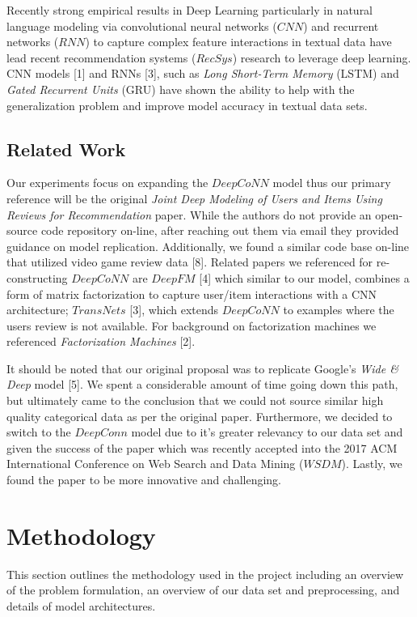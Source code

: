 \documentclass[10pt, twocolumn, letterpaper]{article}
\begin{document}
\par Recently strong empirical results in Deep Learning particularly in natural language modeling via convolutional neural networks ($CNN$) and recurrent networks ($RNN$) to capture complex feature interactions in textual data have lead recent recommendation systems ($RecSys$) research to leverage  deep learning. CNN models [1] and RNNs [3], such as \textit{Long Short-Term Memory} (LSTM) and \textit{Gated Recurrent Units} (GRU) have shown the ability to help with the generalization problem and improve model accuracy in textual data sets.

\subsection{Related Work}
Our experiments focus on expanding the $DeepCoNN$ model thus our primary reference will be the original \textit{Joint Deep Modeling of Users and Items Using Reviews for Recommendation} paper. While the authors do not provide an open-source code repository on-line, after reaching out them via email they provided guidance on model replication. Additionally, we found a similar code base on-line that utilized video game review data [8]. Related papers we referenced for re-constructing $DeepCoNN$ are $DeepFM$ [4] which similar to our model, combines a form of matrix factorization to capture user/item interactions with a CNN architecture; $TransNets$ [3], which extends $DeepCoNN$ to examples where the users review is not available. For background on factorization machines we referenced \textit{Factorization Machines} [2].


It should be noted that our original proposal was to replicate Google's \textit{Wide \& Deep} model [5]. We spent a considerable amount of time going down this path, but ultimately came to the conclusion that we could not source similar high quality categorical data as per the original paper. Furthermore, we decided to switch to the $DeepConn$ model due to it's greater relevancy to our data set and given the success of the paper which was recently accepted into the 2017 ACM International Conference on Web Search and Data Mining ($WSDM$). Lastly, we found the paper to be more innovative and challenging.

\section{Methodology}
This section outlines the methodology used in the project including an overview of the problem formulation, an overview of our data set and preprocessing, and details of model architectures.
\end{document}
